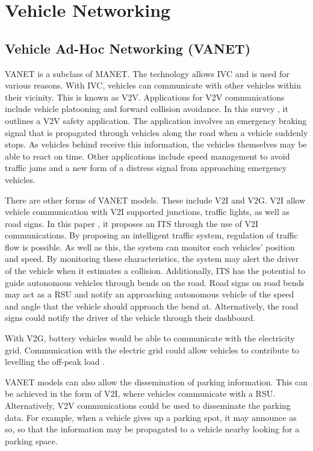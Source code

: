 \section{Vehicle Networking}
\subsection{Vehicle Ad-Hoc Networking (\ac{VANET})}
\ac{VANET} is a subclass of \ac{MANET}. The technology allows \ac{IVC} and is used for various reasons. With \ac{IVC}, vehicles can communicate with other vehicles within their vicinity. This is known as \ac{V2V}. Applications for \ac{V2V} communications include vehicle platooning and forward collision avoidance. In this survey \citep{Kiess2007OnCommunication}, it outlines a \ac{V2V} safety application. The application involves an emergency braking signal that is propagated through vehicles along the road when a vehicle suddenly stops. As vehicles behind receive this information, the vehicles themselves may be able to react on time. Other applications include speed management to avoid traffic jams and a new form of a distress signal from approaching emergency vehicles.

There are other forms of \ac{VANET} models. These include \ac{V2I} and \ac{V2G}. \ac{V2I} allow vehicle communication with \ac{V2I} supported junctions, traffic lights, as well as road signs. In this paper \citep{Milanes2012AnSystem}, it proposes an \ac{ITS} through the use of \ac{V2I} communications. By proposing an intelligent traffic system, regulation of traffic flow is possible. As well as this, the system can monitor each vehicles' position and speed. By monitoring these characteristics, the system may alert the driver of the vehicle when it estimates a collision. Additionally, \ac{ITS} has the potential to guide autonomous vehicles through bends on the road. Road signs on road bends may act as a \ac{RSU} and notify an approaching autonomous vehicle of the speed and angle that the vehicle should approach the bend at. Alternatively, the road signs could notify the driver of the vehicle through their dashboard.

With \ac{V2G}, battery vehicles would be able to communicate with the electricity grid. Communication with the electric grid could allow vehicles to contribute to levelling the off-peak load \citep{Guille2009AImplementation}. 

\ac{VANET} models can also allow the dissemination of parking information. This can be achieved in the form of \ac{V2I}, where vehicles communicate with a \ac{RSU}. Alternatively, \ac{V2V} communications could be used to disseminate the parking data. For example, when a vehicle gives up a parking spot, it may announce as so, so that the information may be propagated to a vehicle nearby looking for a parking space.

